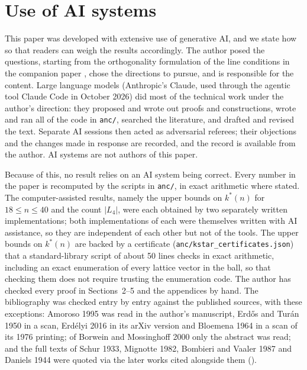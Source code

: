 \section*{Use of AI systems}
\label{sec:ai_statement}

This paper was developed with extensive use of generative AI, and we state how so that readers can weigh the results accordingly.
The author posed the questions, starting from the orthogonality formulation of the line conditions in the companion paper \cite{mathewson_gems}, chose the directions to pursue, and is responsible for the content.
Large language models (Anthropic's Claude, used through the agentic tool Claude Code in October 2026) did most of the technical work under the author's direction: they proposed and wrote out proofs and constructions, wrote and ran all of the code in \texttt{anc/}, searched the literature, and drafted and revised the text.
Separate AI sessions then acted as adversarial referees; their objections and the changes made in response are recorded, and the record is available from the author.
AI systems are not authors of this paper.

Because of this, no result relies on an AI system being correct.
Every number in the paper is recomputed by the scripts in \texttt{anc/}, in exact arithmetic where stated.
The computer-assisted results, namely the upper bounds on $k^*(n)$ for $18\le n\le40$ and the count $|L_4|$, were each obtained by two separately written implementations; both implementations of each were themselves written with AI assistance, so they are independent of each other but not of the tools.
The upper bounds on $k^*(n)$ are backed by a certificate (\texttt{anc/kstar\_certificates.json}) that a standard-library script of about 50 lines checks in exact arithmetic, including an exact enumeration of every lattice vector in the ball, so that checking them does not require trusting the enumeration code.
The author has checked every proof in Sections~2--5 and the appendices by hand.
The bibliography was checked entry by entry against the published sources, with these exceptions: Amoroso 1995 was read in the author's manuscript, Erd\H{o}s and Tur\'an 1950 in a scan, Erd\'elyi 2016 in its arXiv version and Bloemena 1964 in a scan of its 1976 printing; of Borwein and Mossinghoff 2000 only the abstract was read; and the full texts of Schur 1933, Mignotte 1982, Bombieri and Vaaler 1987 and Daniels 1944 were quoted via the later works cited alongside them (\cite{erdosturan1950,amoroso1995,bloemena1964}).
